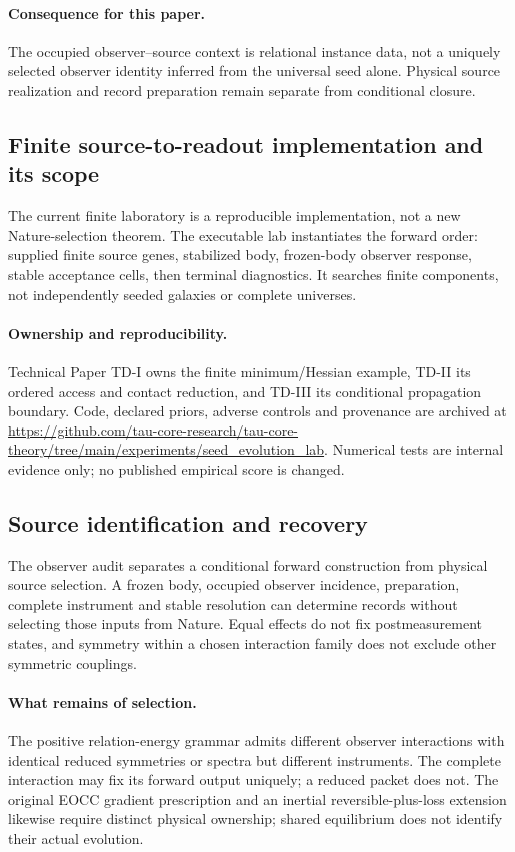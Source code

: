 \documentclass[11pt]{article}
\begin{document}
\paragraph{Consequence for this paper.}
The occupied observer--source context is relational instance data, not a uniquely selected observer identity inferred from the universal seed alone. Physical source realization and record preparation remain separate from conditional closure.

\subsection{Finite source-to-readout implementation and its scope}
The current finite laboratory is a reproducible implementation, not a new Nature-selection theorem. The executable lab instantiates the forward order: supplied finite source genes, stabilized body, frozen-body observer response, stable acceptance cells, then terminal diagnostics. It searches finite components, not independently seeded galaxies or complete universes.
\paragraph{Ownership and reproducibility.}
Technical Paper TD-I owns the finite minimum/Hessian example, TD-II its ordered access and contact reduction, and TD-III its conditional propagation boundary. Code, declared priors, adverse controls and provenance are archived at \url{https://github.com/tau-core-research/tau-core-theory/tree/main/experiments/seed_evolution_lab}. Numerical tests are internal evidence only; no published empirical score is changed.

\subsection{Source identification and recovery}
The observer audit separates a conditional forward construction from physical source selection. A frozen body, occupied observer incidence, preparation, complete instrument and stable resolution can determine records without selecting those inputs from Nature. Equal effects do not fix postmeasurement states, and symmetry within a chosen interaction family does not exclude other symmetric couplings.

\paragraph{What remains of selection.}
The positive relation-energy grammar admits different observer interactions with identical reduced symmetries or spectra but different instruments. The complete interaction may fix its forward output uniquely; a reduced packet does not. The original EOCC gradient prescription and an inertial reversible-plus-loss extension likewise require distinct physical ownership; shared equilibrium does not identify their actual evolution.
\end{document}
